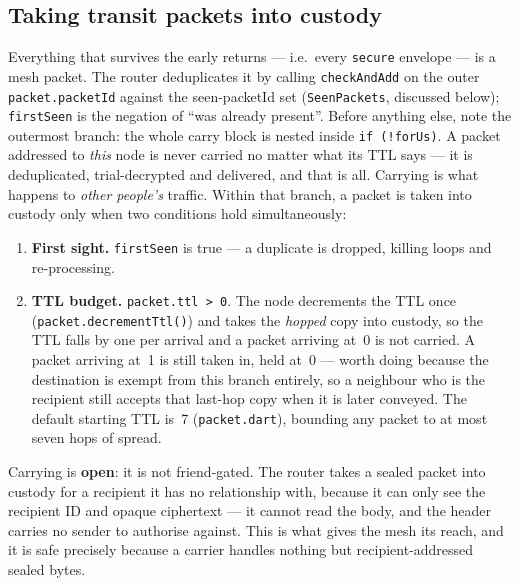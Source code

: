 \documentclass[11pt]{report}
\newcommand{\code}[1]{\texttt{\small #1}}
\begin{document}
\subsection*{Taking transit packets into custody}

Everything that survives the early returns — i.e.\ every \code{secure} envelope — is a mesh packet. The router deduplicates it by calling \code{checkAndAdd} on the outer \code{packet.packetId} against the seen-packetId set (\code{SeenPackets}, discussed below); \code{firstSeen} is the negation of ``was already present''. Before anything else, note the outermost branch: the whole carry block is nested inside \code{if (!forUs)}. A packet addressed to \emph{this} node is never carried no matter what its TTL says — it is deduplicated, trial-decrypted and delivered, and that is all. Carrying is what happens to \emph{other people's} traffic. Within that branch, a packet is taken into custody only when two conditions hold simultaneously:

\begin{enumerate}
\item \textbf{First sight.} \code{firstSeen} is true — a duplicate is dropped, killing loops and re-processing.
\item \textbf{TTL budget.} \code{packet.ttl > 0}. The node decrements the TTL once (\code{packet.decrementTtl()}) and takes the \emph{hopped} copy into custody, so the TTL falls by one per arrival and a packet arriving at~0 is not carried. A packet arriving at~1 is still taken in, held at~0 --- worth doing because the destination is exempt from this branch entirely, so a neighbour who is the recipient still accepts that last-hop copy when it is later conveyed. The default starting TTL is~7 (\code{packet.dart}), bounding any packet to at most seven hops of spread.
\end{enumerate}

Carrying is \textbf{open}: it is not friend-gated. The router takes a sealed packet into custody for a recipient it has no relationship with, because it can only see the recipient ID and opaque ciphertext — it cannot read the body, and the header carries no sender to authorise against. This is what gives the mesh its reach, and it is safe precisely because a carrier handles nothing but recipient-addressed sealed bytes.
\end{document}

